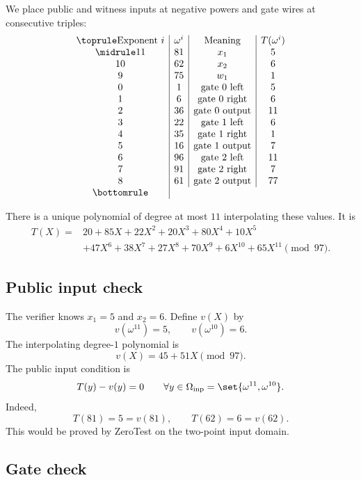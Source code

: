 We place public and witness inputs at negative powers and gate wires at consecutive triples:
\[
\begin{array}{c|c|c|c}
\toprule
\text{Exponent }i & \omega^i & \text{Meaning} & T(\omega^i)\\
\midrule
11 & 81 & x_1 & 5\\
10 & 62 & x_2 & 6\\
9 & 75 & w_1 & 1\\
0 & 1 & \text{gate 0 left} & 5\\
1 & 6 & \text{gate 0 right} & 6\\
2 & 36 & \text{gate 0 output} & 11\\
3 & 22 & \text{gate 1 left} & 6\\
4 & 35 & \text{gate 1 right} & 1\\
5 & 16 & \text{gate 1 output} & 7\\
6 & 96 & \text{gate 2 left} & 11\\
7 & 91 & \text{gate 2 right} & 7\\
8 & 61 & \text{gate 2 output} & 77\\
\bottomrule
\end{array}
\]

There is a unique polynomial of degree at most $11$ interpolating these values. It is
\[
\begin{aligned}
T(X)={}&20+85X+22X^2+20X^3+80X^4+10X^5\\
&+47X^6+38X^7+27X^8+70X^9+6X^{10}+65X^{11}
\pmod{97}.
\end{aligned}
\]

\subsection{Public input check}

The verifier knows $x_1=5$ and $x_2=6$. Define $v(X)$ by
\[
    v(\omega^{11})=5,
    \qquad
    v(\omega^{10})=6.
\]
The interpolating degree-$1$ polynomial is
\[
    v(X)=45+51X\pmod{97}.
\]
The public input condition is
\[
    T(y)-v(y)=0
    \qquad
    \forall y\in\Omega_{\mathrm{inp}}=\set{\omega^{11},\omega^{10}}.
\]
Indeed,
\[
    T(81)=5=v(81),
    \qquad
    T(62)=6=v(62).
\]
This would be proved by ZeroTest on the two-point input domain.

\subsection{Gate check}


